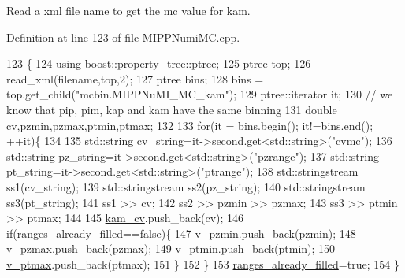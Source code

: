 Read a xml file name to get the mc value for kam. 



Definition at line 123 of file M\-I\-P\-P\-Numi\-M\-C.\-cpp.


\begin{DoxyCode}
123                                                     \{
124     \textcolor{keyword}{using} boost::property\_tree::ptree;
125     ptree top;
126     read\_xml(filename,top,2); 
127     ptree bins;
128     bins = top.get\_child(\textcolor{stringliteral}{"mcbin.MIPPNuMI\_MC\_kam"});
129     ptree::iterator it;    
130     \textcolor{comment}{// we know that pip, pim, kap and kam have the same binning}
131     \textcolor{keywordtype}{double} cv,pzmin,pzmax,ptmin,ptmax;
132     
133     \textcolor{keywordflow}{for}(it = bins.begin(); it!=bins.end(); ++it)\{
134    
135       std::string cv\_string=it->second.get<std::string>(\textcolor{stringliteral}{"cvmc"});
136       std::string pz\_string=it->second.get<std::string>(\textcolor{stringliteral}{"pzrange"});
137       std::string pt\_string=it->second.get<std::string>(\textcolor{stringliteral}{"ptrange"});
138       std::stringstream ss1(cv\_string);
139       std::stringstream ss2(pz\_string);
140       std::stringstream ss3(pt\_string);
141       ss1 >> cv;
142       ss2 >> pzmin >> pzmax;
143       ss3 >> ptmin >> ptmax;
144    
145       \hyperlink{class_neutrino_flux_reweight_1_1_m_i_p_p_numi_m_c_a14a3f0aca4c12ee25194fea6bda18a43}{kam\_cv}.push\_back(cv);
146       \textcolor{keywordflow}{if}(\hyperlink{class_neutrino_flux_reweight_1_1_m_i_p_p_numi_m_c_a13918556257e6e07eb9c83cb9c029a94}{ranges\_already\_filled}==\textcolor{keyword}{false})\{
147         \hyperlink{class_neutrino_flux_reweight_1_1_m_i_p_p_numi_m_c_af6796ed5716ee06589ab1ba6e09fcd82}{v\_pzmin}.push\_back(pzmin);
148         \hyperlink{class_neutrino_flux_reweight_1_1_m_i_p_p_numi_m_c_ac4e9e478e2456cd112522650850b507c}{v\_pzmax}.push\_back(pzmax);
149         \hyperlink{class_neutrino_flux_reweight_1_1_m_i_p_p_numi_m_c_a105e858db8bf5e6b94a69b196815d98a}{v\_ptmin}.push\_back(ptmin);
150         \hyperlink{class_neutrino_flux_reweight_1_1_m_i_p_p_numi_m_c_afab2e17efd7d42565f3e1c8a84064349}{v\_ptmax}.push\_back(ptmax);
151       \}
152     \}
153     \hyperlink{class_neutrino_flux_reweight_1_1_m_i_p_p_numi_m_c_a13918556257e6e07eb9c83cb9c029a94}{ranges\_already\_filled}=\textcolor{keyword}{true};
154   \}
\end{DoxyCode}

